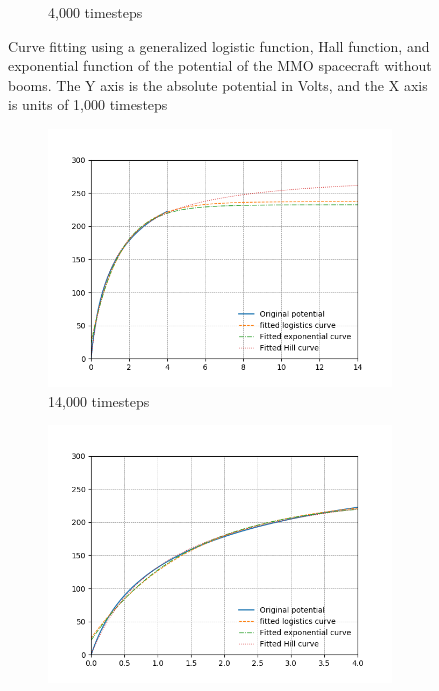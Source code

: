 \begin{center}
\begin{figure}[H]
\begin{subfigure}[b]{0.61\textwidth}
    \caption{4,000 timesteps}
    \label{fig:C_fit_NB_lim}
  \end{subfigure}
  \label{fig:Pot_noPH}
  \caption{Curve fitting using a generalized logistic function, Hall function, and exponential function of the potential of the MMO spacecraft without booms. The Y axis is the absolute potential in Volts, and the X axis is units of 1,000 timesteps}
\end{figure}
\end{center}

\begin{center}
\begin{figure}[H]
  \begin{subfigure}[b]{0.61\textwidth}
    \includegraphics[width=\textwidth]{figures/Appendix/C_fit_WB.png}
    \caption{14,000 timesteps}
    \label{fig:C_fit_NB}
  \end{subfigure}
  \hfill
  \begin{subfigure}[b]{0.61\textwidth}
    \includegraphics[width=\textwidth]{figures/Appendix/C_fit_WB_lim.png}

\end{subfigure}
\end{figure}
\end{center}
